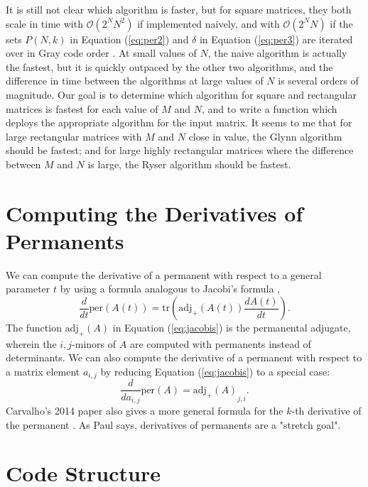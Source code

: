 \documentclass{article}
\begin{document}
It is still not clear which algorithm is faster, but for square matrices, they both scale in time
with $\mathcal{O}(2^N N^2)$ if implemented naively, and with $\mathcal{O}(2^N N)$ if the sets
$P(N,k)$ in Equation (\ref{eq:per2}) and $\delta$ in Equation (\ref{eq:per3}) are iterated over in
Gray code order \cite{wiki:computing,knuth2005}.  At small values of $N$, the naive algorithm is
actually the fastest, but it is quickly outpaced by the other two algorithms, and the difference in
time between the algorithms at large values of $N$ is several orders of magnitude. Our goal is to
determine which algorithm for square and rectangular matrices is fastest for each value of $M$ and
$N$, and to write a function which deploys the appropriate algorithm for the input matrix.  It seems
to me that for large rectangular matrices with $M$ and $N$ close in value, the Glynn algorithm
should be fastest; and for large highly rectangular matrices where the difference between $M$ and
$N$ is large, the Ryser algorithm should be fastest.

\section*{Computing the Derivatives of Permanents}

We can compute the derivative of a permanent with respect to a general parameter $t$ by using
a formula analogous to Jacobi's formula \cite{carvalho2014},
\begin{equation} \label{eq:jacobis}
    \frac{d}{dt}\text{per}(A(t)) = \text{tr}\left(\text{adj}_{+}(A(t))\frac{dA(t)}{dt}\right).
\end{equation}
The function $\text{adj}_{+}(A)$ in Equation (\ref{eq:jacobis}) is the permanental adjugate, wherein
the $i,j$-minors of $A$ are computed with permanents instead of determinants. We can also compute
the derivative of a permanent with respect to a matrix element $a_{i,j}$ by reducing Equation
(\ref{eq:jacobis}) to a special case:
\begin{equation}
    \frac{d}{d{a_{i,j}}}\text{per}(A) = {\text{adj}_{+}(A)}_{j,i}.
\end{equation}
Carvalho's 2014 paper also gives a more general formula for the $k$-th derivative of the
permanent \cite{carvalho2014}. As Paul says, derivatives of permanents are a "stretch goal".

\section*{Code Structure}
\end{document}
